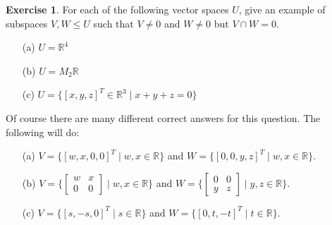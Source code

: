 \documentclass{amsart}
\newcommand{\R}         {{\mathbb{R}}}
\newcommand{\bsm}       {\left[\begin{smallmatrix}}
\newcommand{\esm}       {\end{smallmatrix}\right]}
\newcommand{\st}        {\;|\;}
\renewcommand{\:}       {\colon}
\theoremstyle{definition}
\newtheorem{exercise}{Exercise}[section]
\renewenvironment{solution}{\SolutionAtEnd}{\endSolutionAtEnd}
\begin{document}
\begin{exercise}
 For each of the following vector spaces $U$, give an
 example of subspaces $V,W\leq U$ such that $V\neq 0$ and
 $W\neq 0$ but $V\cap W=0$.
 \begin{itemize}
  \item[(a)] $U=\R^4$
  \item[(b)] $U=M_2\R$
  \item[(c)] $U=\{[x,y,z]^T\in\R^3\st x+y+z=0\}$
 \end{itemize}
\end{exercise}
\begin{solution}
 Of course there are many different correct answers for this
 question.  The following will do:
 \begin{itemize}
  \item[(a)]
   $V=\{[w,x,0,0]^T\st w,x\in\R\}$ and 
   $W=\{[0,0,y,z]^T\st w,x\in\R\}$.
  \item[(b)]
   $V=\{\bsm w&x\\0&0\esm\st w,x\in\R\}$ and
   $W=\{\bsm 0&0\\y&z\esm\st y,z\in\R\}$.   
  \item[(c)]
   $V=\{[s,-s,0]^T\st s\in\R\}$ and
   $W=\{[0,t,-t]^T\st t\in\R\}$.
 \end{itemize}
\end{solution}
\end{document}
